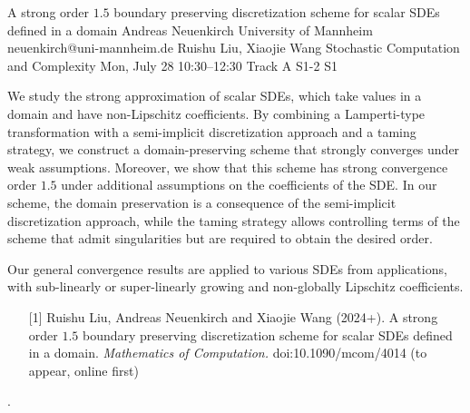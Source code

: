 \begin{talk}
  {A strong order $1.5$ boundary preserving discretization scheme for scalar SDEs defined in a domain}%
  {Andreas Neuenkirch}%
  {University of Mannheim}%
  {neuenkirch@uni-mannheim.de}%
  {Ruishu Liu, Xiaojie Wang}%
  {Stochastic Computation and Complexity}%
  {Mon, July 28 10:30–12:30 Track A}%
  {S1-2}%
  {S1}%
				
			
We study the strong approximation of scalar SDEs, which take values in a domain and have non-Lipschitz coefficients.
By combining a Lamperti-type transformation with a semi-implicit discretization approach and a taming 
strategy,  we construct a domain-preserving scheme that strongly converges under weak assumptions. 
Moreover,
we show that this scheme has strong convergence order $1.5$ under additional assumptions on the coefficients of the SDE. In our scheme, the domain preservation is a consequence of the semi-implicit discretization approach, while the taming strategy allows controlling terms of the scheme that admit singularities but are required to obtain the desired order.

Our general convergence results  are  applied to various SDEs from applications, with sub-linearly or super-linearly growing and non-globally Lipschitz coefficients.


\medskip

\begin{enumerate}
	\item[{[1]}]  Ruishu Liu, Andreas Neuenkirch and Xiaojie Wang (2024+). A strong order $1.5$
	boundary preserving discretization scheme for scalar SDEs defined in a domain. {\it Mathematics of Computation.} doi:10.1090/mcom/4014 (to appear, online first)
\end{enumerate}
.
\end{talk}

